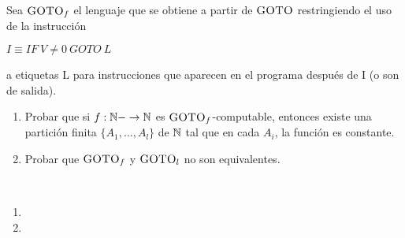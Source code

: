 \documentclass[twoside]{article}
\begin{document}
\begin{ejercicio}{16}
Sea $\textsc{GOTO}_f$ el lenguaje que se obtiene a partir de $\textsc{GOTO}$ restringiendo el uso de la
instrucción

$I\equiv IF\ V\neq 0\ GOTO\ L$

a etiquetas L para instrucciones que aparecen en el programa después de I (o son de salida).

\begin{enumerate}
\item Probar que si $f : \mathbb{N}- \to \mathbb{N}$ es $\textsc{GOTO}_f$-computable, entonces existe una partición finita
$\{A_1,\dots,A_l\}$ de $\mathbb{N}$ tal que en cada $A_i$, la función es constante.
\item Probar que $\textsc{GOTO}_f$ y $\textsc{GOTO}_l$ no son equivalentes.
\end{enumerate}
\end{ejercicio}
\begin{solucion}\
\begin{enumerate}
\item
\item 
\end{enumerate}
\end{solucion}
\end{document}

